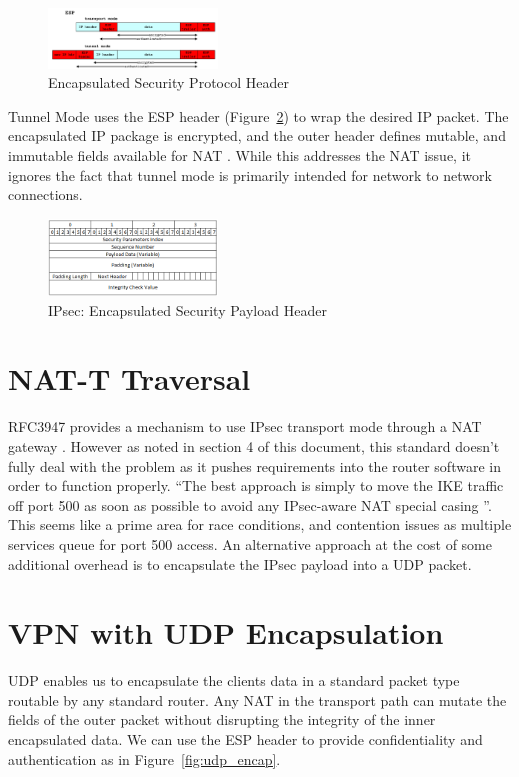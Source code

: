 \documentclass[conference,12pt]{IEEEtran}
\begin{document}
\begin{figure}
\centering
\includegraphics[width=0.4\textwidth]{ESP_example.PNG}
\caption{Encapsulated Security Protocol Header \autocite{ipsec_example}}
\label{fig:esp_example}
\end{figure}


Tunnel Mode uses the ESP header (Figure~\ref{fig:esp}) to wrap the desired IP
packet. The encapsulated IP package is encrypted, and the outer header defines
mutable, and immutable fields available for NAT \autocite{rfc4301}. While this
addresses the NAT issue, it ignores the fact that tunnel mode is primarily
intended for network to network connections.   

\begin{figure}
\centering
\includegraphics[width=0.4\textwidth]{ESP.png}
\caption{IPsec: Encapsulated Security Payload Header}
\label{fig:esp}
\end{figure}

\section{NAT-T Traversal}
RFC3947 provides a mechanism to use IPsec transport mode through a NAT gateway
\autocite{rfc3947}. However as noted in section 4 of this document, this standard doesn't
fully deal with the problem as it pushes requirements into the router software
in order to function properly. ``The best approach is simply to move the IKE traffic off port 500 
as soon as possible to avoid any IPsec-aware NAT special casing
\autocite{rfc3947}''.  This seems like a prime area for race
conditions, and contention issues as multiple services queue for port 500
access.  An alternative approach at the cost of
some additional overhead is to encapsulate the IPsec payload into a UDP packet.

\section{VPN with UDP Encapsulation}
UDP enables us to encapsulate the clients data in a standard packet type
routable by any standard router. Any NAT in the transport path can mutate the
fields of the outer packet without disrupting the integrity of the inner
encapsulated data. We can use the ESP header to provide confidentiality and
authentication as in Figure~\ref{fig:udp_encap}.  
\end{document}
